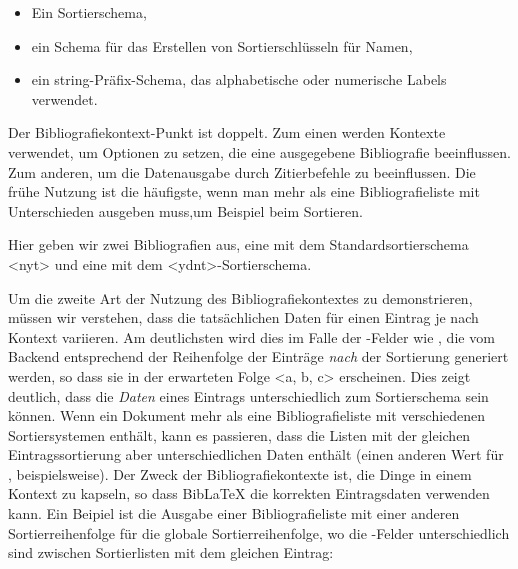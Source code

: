 \documentclass{ltxdockit}[2011/03/25]
\newcommand*{\biblatex}{BibLaTeX\xspace}
\begin{document}
\begin{itemize}
 \item Ein Sortierschema,
 \item ein Schema für das Erstellen von Sortierschlüsseln für Namen,
 \item ein string-Präfix-Schema, das alphabetische oder numerische Labels verwendet. 
\end{itemize}
%
Der Bibliografiekontext-Punkt ist doppelt. Zum einen werden Kontexte verwendet,
um Optionen zu setzen, die eine ausgegebene Bibliografie beeinflussen. Zum anderen,
um die Datenausgabe durch Zitierbefehle zu beeinflussen. 
Die frühe Nutzung ist die häufigste, wenn man mehr als eine Bibliografieliste mit Unterschieden ausgeben muss,um Beispiel beim Sortieren. 

%
Hier geben wir zwei Bibliografien aus, eine mit dem Standardsortierschema <nyt>
und eine mit dem <ydnt>-Sortierschema.

Um die zweite Art der Nutzung des Bibliografiekontextes zu demonstrieren,
müssen wir verstehen, dass die tatsächlichen Daten für einen Eintrag je nach 
Kontext variieren.
Am deutlichsten wird dies im Falle der -Felder wie ,
die vom Backend entsprechend der Reihenfolge der Einträge \emph{nach} der 
Sortierung generiert werden, so dass sie in der erwarteten Folge <a, b, c> 
erscheinen. Dies zeigt deutlich, dass die \emph{Daten} eines Eintrags unterschiedlich
zum Sortierschema sein können. Wenn ein Dokument mehr als eine Bibliografieliste mit verschiedenen Sortiersystemen enthält, kann es passieren, dass die 
Listen mit der gleichen Eintragssortierung aber unterschiedlichen Daten enthält
(einen anderen Wert für , beispielsweise). Der Zweck der Bibliografiekontexte ist, die Dinge in einem Kontext zu kapseln, so dass 
\biblatex die korrekten Eintragsdaten verwenden kann. Ein Beipiel ist die Ausgabe
einer Bibliografieliste mit einer anderen Sortierreihenfolge für die globale
Sortierreihenfolge,  wo die -Felder unterschiedlich sind zwischen Sortierlisten mit dem gleichen Eintrag:
\end{document}
